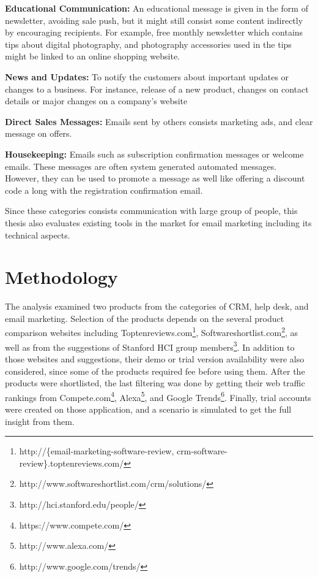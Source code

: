 \begin{compactitem}
	\item \textbf{Educational Communication:} An educational message is given in the form of newsletter, avoiding sale push, but it might still consist some content indirectly by encouraging recipients. For example, free monthly newsletter which contains tips about digital photography, and photography accessories used in the tips might be linked to an online shopping website. 
	\item \textbf{News and Updates:} To notify the customers about important updates or changes to a business. For instance, release of a new product, changes on contact details or major changes on a company's website
	\item \textbf{Direct Sales Messages:} Emails sent by others consists marketing ads, and clear message on offers.
	\item \textbf{Housekeeping:} Emails such as subscription confirmation messages or welcome emails. These messages are often system generated automated messages. However, they can be used to promote a message as well like offering a discount code a long with the registration confirmation email.
\end{compactitem}

Since these categories consists communication with large group of people, this thesis also evaluates existing tools in the market for email marketing including its technical aspects.

\section{Methodology}
\label{sec:3.2:Meth}

The analysis examined two products from the categories of \ac{CRM}, help desk, and email marketing. Selection of the products depends on the several product comparison websites including Toptenreviews.com\footnote{http://\{email-marketing-software-review, crm-software-review\}.toptenreviews.com/ }, Softwareshortlist.com\footnote{http://www.softwareshortlist.com/crm/solutions/}, as well as from the suggestions of Stanford HCI group members\footnote{http://hci.stanford.edu/people/}. In addition to those websites and suggestions, their demo or trial version availability were also considered, since some of the products required fee before using them. After the products were shortlisted, the last filtering was done by getting their web traffic rankings from Compete.com\footnote{https://www.compete.com/}, Alexa\footnote{http://www.alexa.com/}, and Google Trends\footnote{http://www.google.com/trends/}. Finally, trial accounts were created on those application, and a scenario is simulated to get the full insight from them. 

